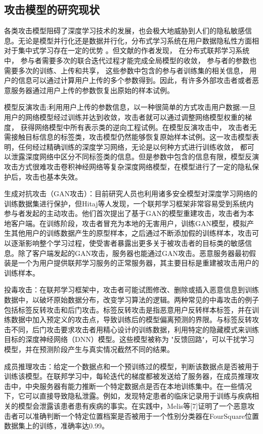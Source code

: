 \subsection{攻击模型的研究现状}
各类攻击模型阻碍了深度学习技术的发展，也会极大地威胁到人们的隐私敏感信息。无论是模型并行化还是数据并行化，分布式学习系统在用户数据隐私性方面相对于集中式学习存在一定的优势 。但文献的作者发现， 在分布式联邦学习系统中， 参与者需要多次的联合迭代过程才能完成全局模型的收敛， 参与者的参数也需要多次的训练、上传和共享， 这些参数中包含的参与者训练集的相关信息， 用户的信息可以通过计算用户上传的多个参数得到。因此，有许多外部攻击者或者恶意服务器通过用户上传的参数恢复出原始的样本试例。

模型反演攻击:利用用户上传的参数信息，以一种很简单的方式攻击用户数据:一旦用户的网络模型经过训练并达到收敛，攻击者就可以通过调整网络模型权重的梯度， 获得网络模型中所有表示类的逆向工程试例。在模型反演攻击中， 攻击者无需接触目标信息的标签类，攻击模型仍然能够恢复原始样本试例。这一攻击模型表明，任何经过精确训练的深度学习网络，无论是以何种方式进行训练收敛， 都可以泄露深度网络中区分不同标签类的信息。但是参数中包含的信息有限，模型反演攻击方式很难攻击卷积神经网络等复杂深度网络模型，在模型进行了一定的隐私保护后，攻击也基本失效。

生成对抗攻击（GAN攻击）：目前研究人员也利用诸多安全模型对深度学习网络的训练数据集进行保护，但Hitaj等人发现，一个联邦学习框架非常容易受到系统内参与者发起的主动攻击。他们首次提出了基于GAN的模型重建攻击，攻击者为本地客户端。在训练阶段，攻击者冒充为本地的无害用户，训练GAN模型，模拟产生其他用户的训练数据产生的原型样本，之后通过不断添加假的训练样本，攻击可以逐渐影响整个学习过程，使受害者暴露出更多关于被攻击者的目标类的敏感信息。除了客户端发起的GAN攻击，服务器也能通过GAN攻击。恶意服务器最初假装是一个为用户提供联邦学习服务的正常服务器，其主要目标是重建被攻击用户的训练样本。

投毒攻击：在联邦学习框架中，攻击者可能试图修改、删除或插入恶意信息到训练数据中，以破坏原始数据分布，改变学习算法的逻辑。两种常见的中毒攻击的例子包括标签反转攻击和后门攻击。标签反转攻击是指恶意用户反转样本标签，并在训练数据中加入预定义的攻击点，导致训练后的模型偏离预测的界限。与标签反转攻击不同，后门攻击要求攻击者用精心设计的训练数据，利用特定的隐藏模式来训练目标的深度神经网络（DNN）模型。这些模型被称为 "反馈回路"，可以干扰学习模型，并在预测阶段产生与真实情况截然不同的结果。

成员推理攻击：给定一个数据点和一个预训练过的模型，判断该数据点是否被用于训练该模型。在联邦学习中，每轮迭代的梯度都被发送给了服务器，在成员推理攻击中，中央服务器有能力推断一个特定数据点是否在本地训练集中。在一些情况下，它可以直接导致隐私泄露。例如，发现特定患者的临床记录用于训练与疾病相关的模型会泄露该患者患有疾病的事实。在实践中，Melis等[7]证明了一个恶意攻击者可以准确判断一个特定位置档案是否被用于一个性别分类器在FourSquare位置数据集上的训练，准确率达0.99。

